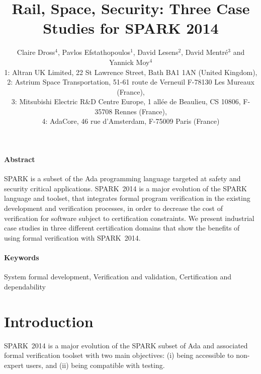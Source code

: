 \documentclass[10pt,a4paper,twocolumn]{article}
\newcommand{\newspark}{SPARK~2014\xspace}
\begin{document}
\title{Rail, Space, Security: Three Case Studies for SPARK 2014}

\author{%
\large Claire Dross$^4$, Pavlos Efstathopoulos$^1$, David Lesens$^2$, David Mentré$^3$ and Yannick Moy$^4$\\
\normalsize 1: Altran UK Limited, 22 St Lawrence Street, Bath BA1 1AN (United Kingdom),\\
\normalsize 2: Astrium Space Transportation, 51-61 route de Verneuil F-78130 Les Mureaux (France),\\
\normalsize 3: Mitsubishi Electric R\&D Centre Europe, 1 allée de
Beaulieu, CS 10806, F-35708 Rennes (France),\\
\normalsize 4: AdaCore, 46 rue d'Amsterdam, F-75009 Paris (France)}

\date{}

\maketitle

\paragraph{Abstract}
SPARK is a subset of the Ada programming language targeted at safety
and security critical applications. \newspark is a major evolution of
the SPARK language and toolset, that integrates formal program
verification in the existing development and verification processes,
in order to decrease the cost of verification for software subject to
certification constraints. We present industrial case studies in three
different certification domains that show the benefits of using formal
verification with \newspark.

\paragraph{Keywords}
System formal development, Verification and validation,
Certification and dependability

\section{Introduction}

\newspark is a major evolution of the SPARK subset of Ada and
associated formal verification toolset with two main objectives: (i)
being accessible to non-expert users, and (ii) being compatible with
testing.
\end{document}
